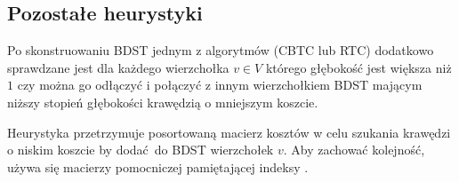 \subsection{Pozostałe heurystyki}
Po skonstruowaniu BDST jednym z algorytmów (CBTC lub RTC) dodatkowo sprawdzane jest dla każdego wierzchołka $v \in V$ którego głębokość jest większa niż $1$ czy można go odłączyć i połączyć z innym wierzchołkiem BDST mającym niższy stopień głębokości krawędzią o mniejszym koszcie.

Heurystyka przetrzymuje posortowaną macierz kosztów w celu szukania krawędzi o niskim koszcie by dodać do BDST wierzchołek $v$. Aby zachować kolejność, używa się macierzy pomocniczej pamiętającej indeksy \cite{DBLP:journals/soco/SinghG07}.
